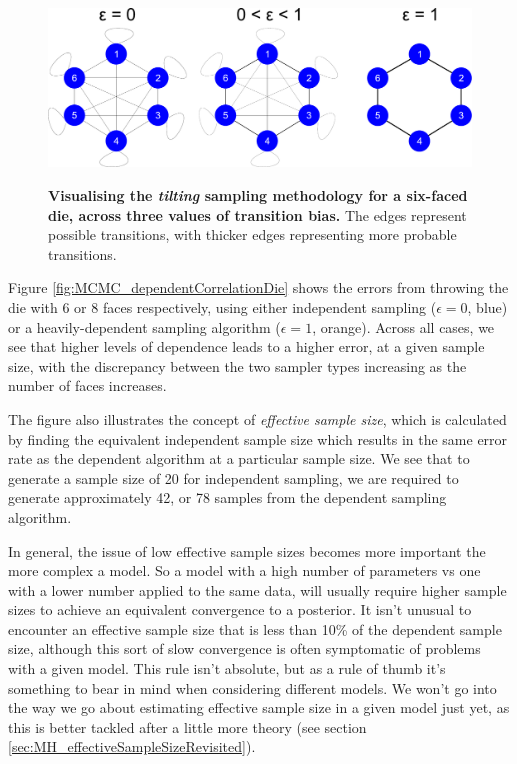 \documentclass[11pt,fullpage]{book}
\begin{document}
\begin{figure}
\centering
\scalebox{0.3} 
{\includegraphics{MCMC_dieDependentMCMC.pdf}}
\caption{\textbf{Visualising the \textit{tilting} sampling methodology for a six-faced die, across three values of transition bias.} The edges represent possible transitions, with thicker edges representing more probable transitions.}\label{fig:MCMC_dieDependentMCMC}
\end{figure}

Figure \ref{fig:MCMC_dependentCorrelationDie} shows the errors from throwing the die with 6 or 8 faces respectively, using either independent sampling ($\epsilon=0$, blue) or a heavily-dependent sampling algorithm ($\epsilon=1$, orange). Across all cases, we see that higher levels of dependence leads to a higher error, at a given sample size, with the discrepancy between the two sampler types increasing as the number of faces increases.

The figure also illustrates the concept of \textit{effective sample size}, which is calculated by finding the equivalent independent sample size which results in the same error rate as the dependent algorithm at a particular sample size. We see that to generate a sample size of 20 for independent sampling, we are required to generate approximately 42, or 78 samples from the dependent sampling algorithm.

In general, the issue of low effective sample sizes becomes more important the more complex a model. So a model with a high number of parameters vs one with a lower number applied to the same data, will usually require higher sample sizes to achieve an equivalent convergence to a posterior. It isn't unusual to encounter an effective sample size that is less than 10\% of the dependent sample size, although this sort of slow convergence is often symptomatic of problems with a given model. This rule isn't absolute, but as a rule of thumb it's something to bear in mind when considering different models. We won't go into the way we go about estimating effective sample size in a given model just yet, as this is better tackled after a little more theory (see section \ref{sec:MH_effectiveSampleSizeRevisited}).
\end{document}
